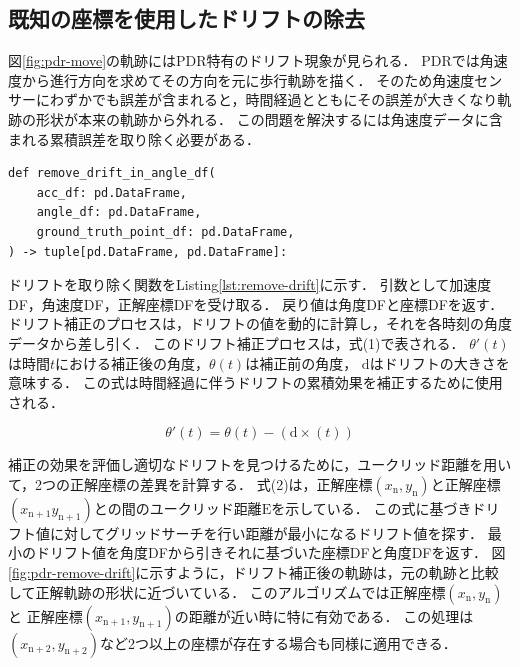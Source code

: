 

\subsection{既知の座標を使用したドリフトの除去}

図\ref{fig:pdr-move}の軌跡にはPDR特有のドリフト現象が見られる．
PDRでは角速度から進行方向を求めてその方向を元に歩行軌跡を描く．
そのため角速度センサーにわずかでも誤差が含まれると，時間経過とともにその誤差が大きくなり軌跡の形状が本来の軌跡から外れる．
この問題を解決するには角速度データに含まれる累積誤差を取り除く必要がある．


\begin{lstlisting}[caption={ドリフト除去}, label=lst:remove-drift,float =h]
def remove_drift_in_angle_df(
    acc_df: pd.DataFrame,
    angle_df: pd.DataFrame,
    ground_truth_point_df: pd.DataFrame,
) -> tuple[pd.DataFrame, pd.DataFrame]:
\end{lstlisting}

ドリフトを取り除く関数をListing\ref{lst:remove-drift}に示す．
引数として加速度DF，角速度DF，正解座標DFを受け取る．
戻り値は角度DFと座標DFを返す．
ドリフト補正のプロセスは，ドリフトの値を動的に計算し，それを各時刻の角度データから差し引く．
このドリフト補正プロセスは，式(1)で表される．
$\theta'(t)$は時間$t$における補正後の角度，$\theta(t)$は補正前の角度，
$\mathrm{d}$はドリフトの大きさを意味する．
この式は時間経過に伴うドリフトの累積効果を補正するために使用される．


\vspace{5mm} %
\begin{equation}
	\theta'(t) = \theta(t) - (\mathrm{d} \times (t))
\end{equation}

\vspace{5mm} %

補正の効果を評価し適切なドリフトを見つけるために，ユークリッド距離を用いて，2つの正解座標の差異を計算する．
式(2)は，正解座標$(x_{\mathrm{n}}, y_{\mathrm{n}})$と正解座標$(x_{\mathrm{n+1}}
	y_{\mathrm{n+1}})$との間のユークリッド距離$\mathrm{E}$を示している．
この式に基づきドリフト値に対してグリッドサーチを行い距離が最小になるドリフト値を探す．
最小のドリフト値を角度DFから引きそれに基づいた座標DFと角度DFを返す．
図\ref{fig:pdr-remove-drift}に示すように，ドリフト補正後の軌跡は，元の軌跡と比較して正解軌跡の形状に近づいている．
このアルゴリズムでは正解座標$(x_{\mathrm{n}}, y_{\mathrm{n}})$と
正解座標$(x_{\mathrm{n+1}}, y_{\mathrm{n+1}})$の距離が近い時に特に有効である．
この処理は$(x_{\mathrm{n+2}}, y_{\mathrm{n+2}})$など2つ以上の座標が存在する場合も同様に適用できる．

